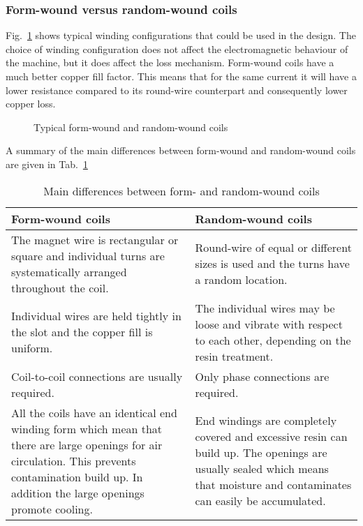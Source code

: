 \subsubsection{Form-wound versus random-wound coils}
Fig.~\ref{fig:insulation} shows typical winding configurations that could be used in the design. The choice of winding configuration does not affect the electromagnetic behaviour of the machine, but it does affect the loss mechanism. Form-wound coils have a much better copper fill factor. This means that for the same current it will have a lower resistance compared to its round-wire counterpart and consequently lower copper loss.   
\begin{figure}[htbp]
  \centering
  \hfill
  \hfill
  \hfill
  \caption{Typical form-wound and random-wound coils} 
  \label{fig:insulation}
\end{figure}
A summary of the main differences between form-wound and random-wound coils are given in Tab.~\ref{tab:form_vs_round}
\begin{table}
\caption{Main differences between form- and random-wound coils}
\label{tab:form_vs_round}
\begin{tabularx}{\textwidth}{XX}
\toprule
\textbf{Form-wound coils}  & \textbf{Random-wound coils} \\\toprule
The magnet wire is rectangular or square and individual turns are systematically arranged throughout the coil. & 
Round-wire of equal or different sizes is used and the turns have a random location.\\\midrule
Individual wires are held tightly in the slot and the copper fill is uniform. &
The individual wires may be loose and vibrate with respect to each other, depending on the resin treatment.\\\midrule
Coil-to-coil connections are usually required. &
Only phase connections are required. \\\midrule
All the coils have an identical end winding form which mean that there are large openings for air circulation. This prevents contamination build up. In addition the large openings promote cooling.&
End windings are completely covered and excessive resin can build up. The openings are usually sealed which means that moisture and contaminates can easily be accumulated.  
\\\bottomrule
\end{tabularx}
\end{table}

